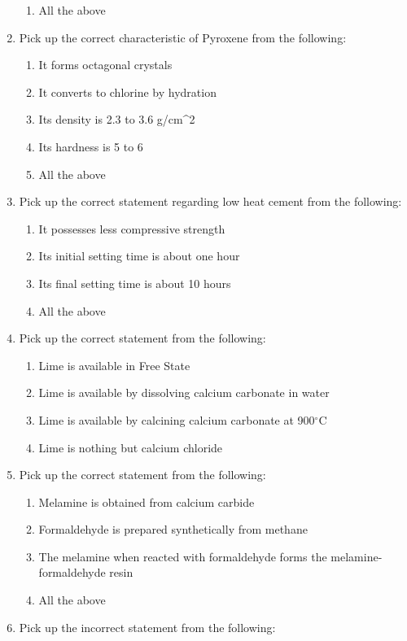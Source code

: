 \documentclass[11pt,a4paper]{article}
\begin{document}
\begin{enumerate}
\begin{enumerate}[label=\Alph*.]
\item{All the above}
\end{enumerate}
\item{Pick up the correct characteristic of Pyroxene from the following:}
\begin{enumerate}[label=\Alph*.]
\item{It forms octagonal crystals}
\item{It converts to chlorine by hydration}
\item{Its density is 2.3 to 3.6 g/cm\^{}2}
\item{Its hardness is 5 to 6}
\item{All the above}
\end{enumerate}
\item{Pick up the correct statement regarding low heat cement from the following:}
\begin{enumerate}[label=\Alph*.]
\item{It possesses less compressive strength}
\item{Its initial setting time is about one hour}
\item{Its final setting time is about 10 hours}
\item{All the above}
\end{enumerate}
\item{Pick up the correct statement from the following:}
\begin{enumerate}[label=\Alph*.]
\item{Lime is available in Free State}
\item{Lime is available by dissolving calcium carbonate in water}
\item{Lime is available by calcining calcium carbonate at 900$^\circ$C}
\item{Lime is nothing but calcium chloride}
\end{enumerate}
\item{Pick up the correct statement from the following:}
\begin{enumerate}[label=\Alph*.]
\item{Melamine is obtained from calcium carbide}
\item{Formaldehyde is prepared synthetically from methane}
\item{The melamine when reacted with formaldehyde forms the melamine-formaldehyde resin}
\item{All the above}
\end{enumerate}
\item{Pick up the incorrect statement from the following:}

\end{enumerate}
\end{document}
